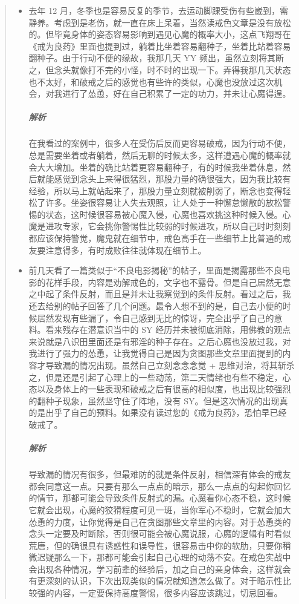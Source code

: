\begin{quotation}
\begin{itemize}
        \item 去年 12 月，冬季也是容易反复的季节，去运动脚踝受伤有些崴到，需静养。考虑到是老伤，就一直在床上呆着，当然读戒色文章是没有放松的。但毕竟身体的姿态容易影响到遇见心魔的概率大小，这点飞翔哥在《戒为良药》里面也提到过，躺着比坐着容易翻种子，坐着比站着容易翻种子。由于行动不便的缘故，我那几天 YY 频出，虽然立刻将其断之，但念头就像打不完的小怪，时不时的出现一下。弄得我那几天状态也不太好，和破戒之后的感觉也有些许的类似，心魔也没放过这次机会，对我进行了怂恿，好在自己积累了一定的功力，并未让心魔得逞。\subparagraph{解析} 在我看过的案例中，很多人在受伤后反而更容易破戒，因为行动不便，总是需要坐着或者躺着，然后无聊的时候太多，这样遭遇心魔的概率就会大大增加。坐着的确比站着更容易翻种子，有的时候我坐着休息，然后就能感觉到念头上来得很猛烈，那股力量的确很强大，因为我比较有经验，所以马上就站起来了，那股力量立刻就被削弱了，断念也变得轻松了许多。坐姿很容易让人失去观照，让人处于一种懈怠懒散的放松警惕的状态，这时候很容易被心魔入侵，心魔也喜欢挑这种时候入侵。心魔是进攻专家，它会挑你警惕性比较弱的时候进攻，所以自己时时刻刻都应该保持警觉，魔鬼就在细节中，戒色高手在一些细节上比普通的戒友要注意得多，有时成败往往就体现在细节上。
        \item 前几天看了一篇类似于“不良电影揭秘”的帖子，里面是揭露那些不良电影的花样手段，内容是劝解戒色的，文字也不露骨。但是自己居然无意之中起了条件反射，而且是并未让我察觉到的条件反射。看过之后，我还去给别的帖子回答了几个问题。最令人想不到的是，自己去小便的时候居然发现有些漏了，令自己感到无比的惊讶，完全出乎了自己的意料。看来残存在潜意识当中的 SY 经历并未被彻底消除，用佛教的观点来说就是八识田里面还是有邪淫的种子存在。之后心魔也没放过我，对我进行了强力的怂恿，让我觉得自己是因为贪图那些文章里面提到的内容才导致漏的情况出现。虽然自己立刻念念念觉 + 思维对治，将其斩杀之，但是还是引起了心理上的一些动荡，第二天情绪也有些不稳定，心态以及身体上的一些表现和破戒之后有很高的相似度，也出现比较强烈的翻种子现象，虽然坚守住了阵地，没有 SY。但是这次情况的出现真的是出乎了自己的预料。如果没有读过您的《戒为良药》，恐怕早已经破戒了。\subparagraph{解析} 导致漏的情况有很多，但最难防的就是条件反射，相信深有体会的戒友都会同意这一点。只要有那么一点点的暗示，那么一点点的勾起你回忆的情节，那都可能会导致条件反射式的漏。心魔看你心态不稳，这时候它就会出现，心魔的狡猾程度可见一斑，当你军心不稳时，它就会加大怂恿的力度，让你觉得是自己在贪图那些文章里的内容。对于怂恿类的念头一定要及时断除，否则很可能会被心魔说服，心魔的逻辑有时看似荒唐，但的确很具有诱惑性和误导性，很容易击中你的软肋，只要你稍微迟疑那么一下，那都可能会引起自己心理的动荡不安。在戒色实战中会出现各种情况，学习前辈的经验后，加之自己的亲身体会，这样就会有更深刻的认识，下次出现类似的情况就知道怎么做了。对于暗示性比较强的内容，一定要保持高度警惕，很多内容应该跳过，切忌回看。

\end{itemize}
\end{quotation}
